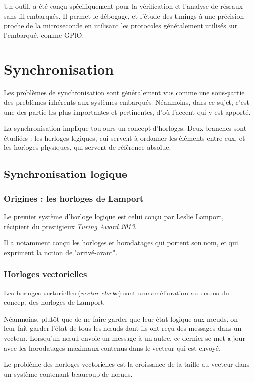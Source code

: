 Un outil,  \cite{lim2013flocklab} a été conçu spécifiquement pour la vérification et l'analyse de réseaux sans-fil embarqués. Il permet le débogage, et l'étude des timings à une précision proche de la microseconde en utilisant les protocoles généralement utilisés sur l'embarqué, comme \ac{GPIO}.  

\section{Synchronisation}
Les problèmes de synchronisation sont généralement vus comme une sous-partie des problèmes inhérents aux systèmes embarqués. Néanmoins, dans ce sujet, c'est une des partie les plus importantes et pertinentes, d'où l'accent qui y est apporté.

La synchronisation implique toujours un concept d'horloges. Deux branches sont étudiées : les horloges logiques, qui servent à ordonner les éléments entre eux, et les horloges physiques, qui servent de référence absolue.

\subsection{Synchronisation logique}
\subsubsection{Origines : les horloges de Lamport}
Le premier système d'horloge logique est celui conçu par Leslie Lamport, récipient du prestigieux \textit{Turing Award 2013}.

Il a notamment conçu les horloges et horodatages qui portent son nom, et qui expriment la notion de "arrivé-avant".
\subsubsection{Horloges vectorielles}
Les horloges vectorielles (\textit{vector clocks}) sont une amélioration au dessus du concept des horloges de Lamport.

Néanmoins, plutôt que de ne faire garder que leur état logique aux nœuds, on leur fait garder l'état de tous les nœuds dont ils ont reçu des messages dans un vecteur. Lorsqu'un nœud envoie un message à un autre, ce dernier se met à jour avec les horodatages maximaux contenus dans le vecteur qui est envoyé.

Le problème des horloges vectorielles est la croissance de la taille du vecteur dans un système contenant beaucoup de nœuds.

